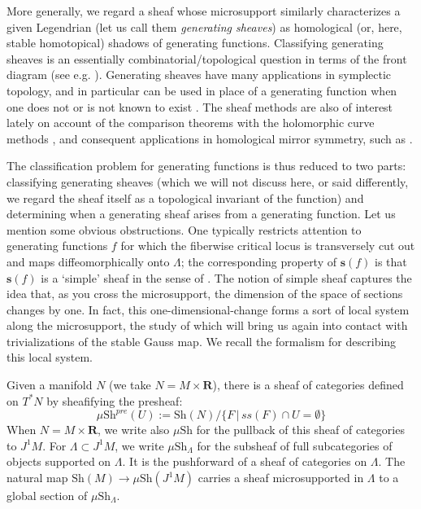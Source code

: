 \documentclass[12pt,a4paper]{article}
\numberwithin{equation}{section}
\theoremstyle{definition}
\theoremstyle{remark}
\newcommand{\R}{\mathbf{R}}
\newcommand{\Sh}{\mathrm{Sh}}
\begin{document}
More generally, we regard a sheaf whose microsupport similarly characterizes a given Legendrian
(let us call them {\em generating sheaves})
as homological (or, here, stable homotopical) shadows of generating functions.  Classifying generating sheaves is an essentially combinatorial/topological question in terms of the front diagram (see e.g. \cite{STZ}).
Generating sheaves have many applications in symplectic topology, and in particular can be used in place of a generating function when one does not or is not known to exist \cite{Tamarkin, GKS, Guillermou, Shende-conormal, Chiu-nonsqueezing, Zhang-capacities, Asano-heavy}.
The sheaf methods are also of interest lately on account of the comparison theorems with the holomorphic curve methods \cite{Nadler-Zaslow, Nadler, GPS3, Viterbo-sheaf}, and consequent applications in homological mirror symmetry, such as \cite{FLTZ, Kuwagaki, Gammage-Shende, GMW}.


The classification problem for generating functions is thus reduced to two parts: classifying generating sheaves (which we will not discuss here, or said differently, we regard the sheaf itself as a topological invariant of the function) and determining when a generating sheaf arises from a generating function.
Let us mention some obvious obstructions.  One typically restricts attention to generating functions $f$ for which the fiberwise critical locus is transversely cut out and maps diffeomorphically onto $\Lambda$; the corresponding property of $\mathbf{s}(f)$ is that $\mathbf{s}(f)$ is a `simple' sheaf in the sense of \cite[Def. 7.5.4]{Kashiwara-Schapira}.  The notion of simple sheaf captures the idea that, as you cross the microsupport, the dimension of the space of sections changes by one.
In fact, this one-dimensional-change forms a sort of local system along the microsupport, the study of which will bring us again into contact with trivializations of the stable Gauss map.   We recall the formalism for describing this local system.

Given a manifold $N$ (we take $N = M \times \R$), there is a sheaf of categories defined on $T^*N$ by sheafifying the presheaf:
$$\mu \Sh^{pre}(U) := \Sh(N) / \{F\,|\, ss(F) \cap U = \emptyset \}$$
When $N = M \times \R$, we write also $\mu \Sh$ for the pullback of this sheaf of categories to $J^1 M$.  For $\Lambda \subset J^1 M$, we write $\mu \Sh_\Lambda$ for the subsheaf of full subcategories of objects supported on $\Lambda$.  It is the pushforward of a sheaf of categories on $\Lambda$.  The natural map $\Sh(M) \to \mu \Sh(J^1 M)$ carries a sheaf microsupported in $\Lambda$ to a global section of $\mu \Sh_\Lambda$.
\end{document}
